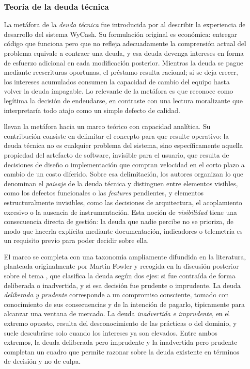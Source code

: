 \subsubsection{Teoría de la deuda técnica}

La metáfora de la \textit{deuda técnica} fue introducida por \textcite{Cunningham1992} al describir la experiencia de desarrollo del sistema WyCash. Su formulación original es económica: entregar código que funciona pero que no refleja adecuadamente la comprensión actual del problema equivale a contraer una deuda, y esa deuda devenga intereses en forma de esfuerzo adicional en cada modificación posterior. Mientras la deuda se pague mediante reescrituras oportunas, el préstamo resulta racional; si se deja crecer, los intereses acumulados consumen la capacidad de cambio del equipo hasta volver la deuda impagable. Lo relevante de la metáfora es que reconoce como legítima la decisión de endeudarse, en contraste con una lectura moralizante que interpretaría todo atajo como un simple defecto de calidad.

\textcite{Kruchten2012} llevan la metáfora hacia un marco teórico con capacidad analítica. Su contribución consiste en delimitar el concepto para que resulte operativo: la deuda técnica no es cualquier problema del sistema, sino específicamente aquella propiedad del artefacto de software, invisible para el usuario, que resulta de decisiones de diseño o implementación que compran velocidad en el corto plazo a cambio de un costo diferido. Sobre esa delimitación, los autores organizan lo que denominan el \textit{paisaje} de la deuda técnica y distinguen entre elementos visibles, como los defectos funcionales o las \textit{features} pendientes, y elementos estructuralmente invisibles, como las decisiones de arquitectura, el acoplamiento excesivo o la ausencia de instrumentación. Esta noción de \textit{visibilidad} tiene una consecuencia directa de gestión: la deuda que nadie percibe no se prioriza, de modo que hacerla explícita mediante documentación, indicadores o telemetría es un requisito previo para poder decidir sobre ella.

El marco se completa con una taxonomía ampliamente difundida en la literatura, planteada originalmente por Martin Fowler y recogida en la discusión posterior sobre el tema \cite{Kruchten2012}, que clasifica la deuda según dos ejes: si fue contraída de forma deliberada o inadvertida, y si esa decisión fue prudente o imprudente. La deuda \textit{deliberada y prudente} corresponde a un compromiso consciente, tomado con conocimiento de sus consecuencias y de la intención de pagarlo, típicamente para alcanzar una ventana de mercado. La deuda \textit{inadvertida e imprudente}, en el extremo opuesto, resulta del desconocimiento de las prácticas o del dominio, y suele descubrirse solo cuando los intereses ya son elevados. Entre ambos extremos, la deuda deliberada pero imprudente y la inadvertida pero prudente completan un cuadro que permite razonar sobre la deuda existente en términos de decisión y no de culpa.

